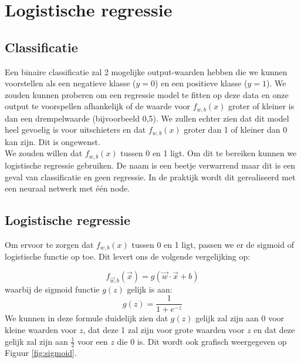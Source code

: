 \section{Logistische regressie }

\subsection{Classificatie}
Een binaire classificatie zal 2 mogelijke output-waarden hebben die we kunnen voorstellen als een negatieve klasse ($y = 0$) en een positieve klasse ($y = 1$).  We zouden kunnen proberen om een regressie model te fitten op deze data en onze output te voorspellen afhankelijk of de waarde voor $f_{w,b}(x)$ groter of kleiner is dan een drempelwaarde (bijvoorbeeld 0,5). We zullen echter zien dat dit model heel gevoelig is voor uitschieters en dat $f_{w,b}(x)$ groter dan 1 of kleiner dan 0 kan zijn. Dit is ongewenst.\\
\newline
We zouden willen dat $f_{w,b}(x)$ tussen 0 en 1 ligt. Om dit te bereiken kunnen we logistische regressie gebruiken. De naam is een beetje verwarrend maar dit is een geval van classificatie en geen regressie. In de praktijk wordt dit gerealiseerd met een neuraal netwerk met één node. 

\subsection{Logistische regressie }
\label{ch:logistic-regression}
Om ervoor te zorgen dat $f_{w,b}(x)$ tussen 0 en 1 ligt, passen we er de sigmoid of logistische functie op toe. Dit levert ons de volgende vergelijking op: 

\begin{equation}
	f_{\vec{w},b}(\vec{x}) = g(\vec{w} \cdot \vec{x} + b)
	\label{eq:f-wb-log}
\end{equation}
waarbij de sigmoid functie $g(z)$ gelijk is aan:
\begin{equation}
	g(z) = \frac{1}{1 + e^{-z}}
	\label{eq:sigmoid}
\end{equation}
\noindent
We kunnen in deze formule duidelijk zien dat $g(z)$ gelijk zal zijn aan 0 voor kleine waarden voor $z$, dat deze 1 zal zijn voor grote waarden voor $z$ en dat deze gelijk zal zijn aan $\frac{1}{2}$ voor een $z$ die 0 is. Dit wordt ook grafisch weergegeven op Figuur \ref{fig:sigmoid}.

